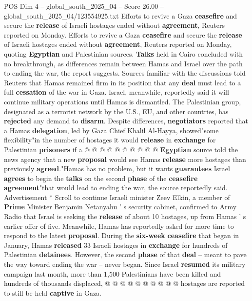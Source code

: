 \begin{textsample}{POS Dim 4 – global\_south\_2025\_04 – Score 26.00 – global\_south\_2025\_04/123554925.txt}  \label{ex:f4_pos_241}
Efforts to revive a Gaza \textbf{ceasefire} and secure the \textbf{release} of Israeli hostages ended without \textbf{agreement}, Reuters reported on Monday.
Efforts to revive a Gaza \textbf{ceasefire} and secure the \textbf{release} of Israeli hostages ended without \textbf{agreement}, Reuters reported on Monday, quoting \textbf{Egyptian} and Palestinian sources. \textbf{Talks} held in Cairo concluded with no breakthrough, as differences remain between Hamas and Israel over the path to ending the war, the report suggests.
Sources familiar with the discussions told Reuters that Hamas remained firm in its position that any \textbf{deal} must lead to a full \textbf{cessation} of the war in Gaza.
Israel, meanwhile, reportedly said it will continue military operations until Hamas is dismantled.
The Palestinian group, designated as a terrorist network by the U.S., EU, and other countries, has \textbf{rejected} any demand to \textbf{disarm}.
Despite differences, \textbf{negotiators} reported that a Hamas \textbf{delegation}, led by Gaza Chief Khalil Al-Hayya, showed"some flexibility"in the number of hostages it would \textbf{release} in \textbf{exchange} for Palestinian \textbf{prisoners} if a @ @ @ @ @ @ @ @ @ @ \textbf{Egyptian} source told the news agency that a new \textbf{proposal} would see Hamas \textbf{release} more hostages than previously \textbf{agreed}."Hamas has no problem, but it wants \textbf{guarantees} Israel \textbf{agrees} to begin the \textbf{talks} on the second \textbf{phase} of the \textbf{ceasefire} \textbf{agreement}"that would lead to ending the war, the source reportedly said.
Advertisement * Scroll to continue Israeli minister Zeev Elkin, a member of \textbf{Prime} Minister Benjamin Netanyahu ' s security cabinet, confirmed to Army Radio that Israel is seeking the \textbf{release} of about 10 hostages, up from Hamas ' s earlier offer of five.
Meanwhile, Hamas has reportedly asked for more time to respond to the latest \textbf{proposal}.
During the \textbf{six-week} \textbf{ceasefire} that began in January, Hamas \textbf{released} 33 Israeli hostages in \textbf{exchange} for hundreds of Palestinian \textbf{detainees}.
However, the second \textbf{phase} of that \textbf{deal} -- meant to pave the way toward ending the war -- never began.
Since Israel \textbf{resumed} its military campaign last month, more than 1,500 Palestinians have been killed and hundreds of thousands displaced, @ @ @ @ @ @ @ @ @ @ hostages are reported to still be held \textbf{captive} in Gaza.

\end{textsample}

